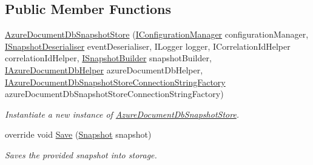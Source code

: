 \subsection*{Public Member Functions}
\begin{DoxyCompactItemize}
\item 
\hyperlink{classCqrs_1_1Azure_1_1DocumentDb_1_1Events_1_1AzureDocumentDbSnapshotStore_a0a9a2c75989e00d8e7e9bd28cdbaa33e_a0a9a2c75989e00d8e7e9bd28cdbaa33e}{Azure\+Document\+Db\+Snapshot\+Store} (\hyperlink{interfaceCqrs_1_1Configuration_1_1IConfigurationManager}{I\+Configuration\+Manager} configuration\+Manager, \hyperlink{interfaceCqrs_1_1Events_1_1ISnapshotDeserialiser}{I\+Snapshot\+Deserialiser} event\+Deserialiser, I\+Logger logger, I\+Correlation\+Id\+Helper correlation\+Id\+Helper, \hyperlink{interfaceCqrs_1_1Events_1_1ISnapshotBuilder}{I\+Snapshot\+Builder} snapshot\+Builder, \hyperlink{interfaceCqrs_1_1Azure_1_1DocumentDb_1_1IAzureDocumentDbHelper}{I\+Azure\+Document\+Db\+Helper} azure\+Document\+Db\+Helper, \hyperlink{interfaceCqrs_1_1Azure_1_1DocumentDb_1_1Events_1_1IAzureDocumentDbSnapshotStoreConnectionStringFactory}{I\+Azure\+Document\+Db\+Snapshot\+Store\+Connection\+String\+Factory} azure\+Document\+Db\+Snapshot\+Store\+Connection\+String\+Factory)
\begin{DoxyCompactList}\small\item\em Instantiate a new instance of \hyperlink{classCqrs_1_1Azure_1_1DocumentDb_1_1Events_1_1AzureDocumentDbSnapshotStore}{Azure\+Document\+Db\+Snapshot\+Store}. \end{DoxyCompactList}\item 
override void \hyperlink{classCqrs_1_1Azure_1_1DocumentDb_1_1Events_1_1AzureDocumentDbSnapshotStore_a52dd38e57e884db7529c8f57c3da7479_a52dd38e57e884db7529c8f57c3da7479}{Save} (\hyperlink{classCqrs_1_1Snapshots_1_1Snapshot}{Snapshot} snapshot)
\begin{DoxyCompactList}\small\item\em Saves the provided {\itshape snapshot}  into storage. \end{DoxyCompactList}\end{DoxyCompactItemize}
